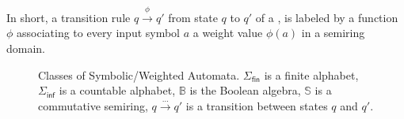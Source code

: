 
In short, a transition rule $q \xrightarrow{\phi} q'$ from state $q$ to $q'$ of a \swM,
is labeled by a function $\phi$ associating to every input symbol $a$ a weight value $\phi(a)$
in a semiring domain.
%
\begin{figure}
\centering
{}
\caption{Classes of Symbolic/Weighted Automata.
$\Sigma_\mathsf{fin}$ is a finite alphabet,
$\Sigma_\mathsf{inf}$ is a countable alphabet,
$\mathbb{B}$ is the Boolean algebra,
$\mathbb{S}$ is a commutative semiring,
$q \xrightarrow{\dots} q'$ is a transition between states $q$ and $q'$.}
\label{fig:hierarchy}
\end{figure}
